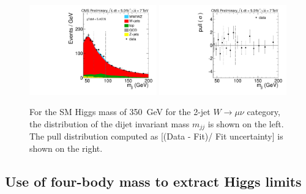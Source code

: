 \begin{figure}[!t]
  \centering
  \includegraphics[width=0.49\textwidth]{plots/anaexample/H350_Mjj_Muon_2jets_Stacked}
  \includegraphics[width=0.49\textwidth]{plots/anaexample/H350_Mjj_Muon_2jets_Pull}
  \caption{\label{fig:mjj_mH350}For the SM Higgs mass of
    350~GeV for the 2-jet $W\to\mu\nu$ category, the distribution of
    the dijet invariant mass $m_{jj}$ is shown on the left. The pull
    distribution computed as [(Data - Fit)/ Fit uncertainty] is shown
    on the right.}
\end{figure}


\subsection{Use of four-body mass to extract Higgs limits}
\label{sec:mlvjjforlimit}


